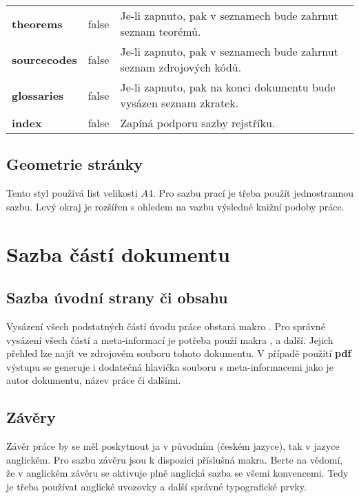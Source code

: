 \documentclass[
  master=false                %
  font=sans,                  %
  printversion=false,         %
  joinlists=true,             %
  glossaries=true,            %
  figures=true,               %
  tables=true,                %
  sourcecodes=true,					  %
  theorems=true,						  %
  bibencoding=utf8,           %
  language=czech,             %
  encoding=utf8,              %
  field=inf,                  %
  index=true,                 %
]{updiplom}
\begin{document}
\begin{table}
\begin{center}
\begin{tabular}{>{\bfseries}l >{\ttfamily}c L{8cm}}
theorems & false & Je-li zapnuto, pak v seznamech bude zahrnut seznam teorémů. \\

sourcecodes & false & Je-li zapnuto, pak v seznamech bude zahrnut seznam zdrojových kódů. \\

glossaries & false & Je-li zapnuto, pak na konci dokumentu bude vysázen seznam zkratek. \\

index & false & Zapíná podporu sazby rejstříku.
\end{tabular}
\end{center}
\end{table}

\subsection{Geometrie stránky}
Tento styl používá list velikosti $A4$. Pro sazbu prací je třeba použít jednostrannou sazbu. Levý okraj je rozšířen s ohledem na vazbu výsledné knižní podoby práce.

\section{Sazba částí dokumentu}
\subsection{Sazba úvodní strany či obsahu}
Vysázení všech podstatných částí úvodu práce obstará makro . Pro správné vysázení všech částí a meta-informací je potřeba použí makra ,  a další. Jejich přehled lze najít ve zdrojovém souboru tohoto dokumentu. V případě použítí \textbf{pdf} výstupu se generuje i dodatečná hlavička souboru s meta-informacemi jako je autor dokumentu, název práce či dalšími.

\subsection{Závěry}
Závěr práce by se měl poskytnout ja v původním (českém jazyce), tak v jazyce anglickém. Pro sazbu závěru jsou k dispozici příslušná makra. Berte na vědomí, že v anglickém závěru se aktivuje plně anglická sazba se všemi konvencemi. Tedy je třeba používat anglické uvozovky a další správné typografické prvky.
\end{document}
